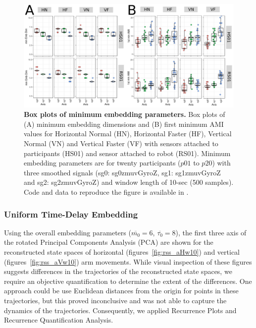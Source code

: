 \documentclass[fleqn,10pt]{wlscirep}
\begin{document}
\begin{figure}[ht]
\centering
\includegraphics[width=1.0\textwidth]{fig2}
	\caption{
	{\bf Box plots of minimum embedding parameters.} 
	Box plots of (A) minimum embedding dimensions 
	and (B) first minimum AMI values for 
	Horizontal Normal (HN), Horizontal Faster (HF),
	Vertical Normal (VN) and Vertical Faster (VF)
	with sensors attached to participants (HS01) and
	sensor attached to robot (RS01).
	Minimum embedding parameters are for twenty participants 
	($p01$ to $p20$) with three smoothed signals 
	(sg0: sg0zmuvGyroZ, sg1: sg1zmuvGyroZ and sg2: sg2zmuvGyroZ)
	and window length of 10-sec (500 samples).
	Code and data to reproduce the figure is available in \cite{srep2020}.
        }
    \label{fig:cao_ami}
\end{figure}

\subsubsection*{Uniform Time-Delay Embedding}
Using the overall embedding parameters ($\overline{m_0}=6$, $\overline{\tau_0}=8$), 
the first three axis of the rotated Principal Components Analysis (PCA) 
are shown for the reconstructed state spaces of horizontal (figures~\ref{fig:rss_aHw10}) 
and vertical (figures~\ref{fig:rss_aVw10}) arm movements. 
While visual inspection of these figures 
suggests differences in the trajectories of the reconstructed state spaces, 
we require an objective quantification to determine the extent of the differences.  
One approach could be use Euclidean distances from the origin for points in these 
trajectories, but this proved inconclusive and was not able to capture 
the dynamics of the trajectories. Consequently, we applied 
Recurrence Plots and Recurrence Quantification Analysis.
\end{document}
